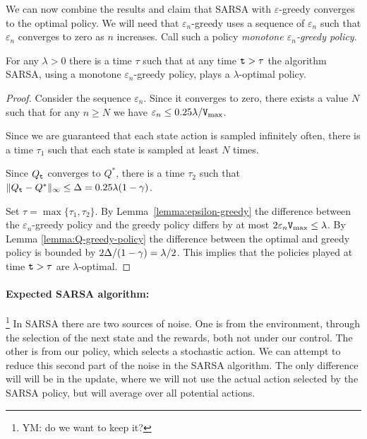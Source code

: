 We can now combine the results and claim that SARSA with
$\varepsilon$-greedy converges to the optimal policy. We will need
that $\varepsilon_n$-greedy uses a sequence of $\varepsilon_n$ such
that $\varepsilon_n$ converges to zero as $n$ increases. Call such a
policy \emph{monotone $\varepsilon_n$-greedy policy}.

\begin{theorem}
For any $\lambda>0$ there is a time $\tau$ such that at any time
${\tt t}>\tau$ the algorithm SARSA, using a monotone
$\varepsilon_n$-greedy policy, plays a $\lambda$-optimal policy.
\end{theorem}

\begin{proof}
Consider the sequence $\varepsilon_n$. Since it converges to zero,
there exists a value $N$ such that for any $n\geq N$ we have
$\varepsilon_n\leq 0.25\lambda/{\tt V}_{\max }$.

Since we are guaranteed that each state action is sampled infinitely
often, there is a time $\tau_1$ such that each state is sampled at
least $N$ times.

Since $Q_{\tt t}$ converges to $Q^*$, there is a time $\tau_2$ such
that $\|Q_{\tt t}-Q^*\|_\infty \leq \Delta=0.25\lambda (1-\gamma)$.

Set $\tau=\max\{\tau_1,\tau_2\}$. By
Lemma~\ref{lemma:epsilon-greedy} the difference between the
$\varepsilon_n$-greedy policy and the greedy policy differs by at
most $2\varepsilon_n{\tt V}_{\max }\leq \lambda$. By Lemma
\ref{lemma:Q-greedy-policy} the difference between the optimal and
greedy policy is bounded by $2\Delta/(1-\gamma)=\lambda/2$. This
implies that the policies played at time ${\tt t}>\tau$ are
$\lambda$-optimal.
\end{proof}


\paragraph{Expected SARSA algorithm:}\footnote{YM: do we want to keep it?}
In SARSA there are two sources of noise.
One is from the environment, through the selection of the next state
and the rewards, both not under our control. The other is from our
policy, which selects a stochastic action. We can attempt to reduce
this second part of the noise in the SARSA algorithm. The only
difference will will be in the update, where we will not use the
actual action selected by the SARSA policy, but will average over
all potential actions.


